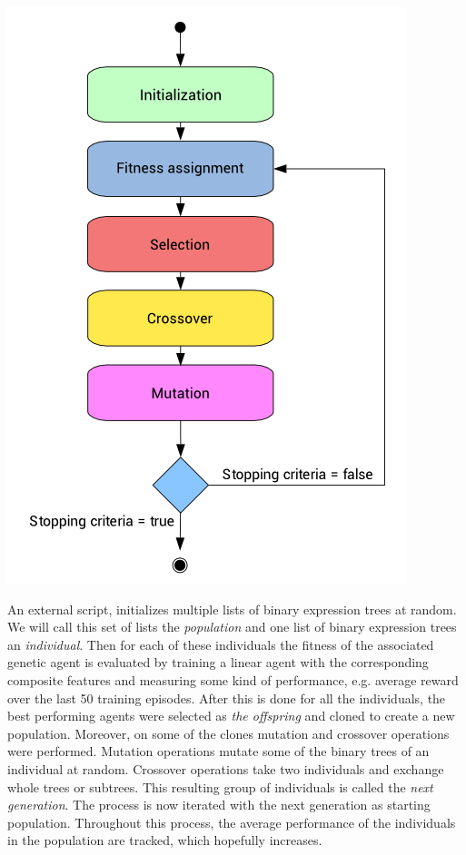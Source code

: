 \begin{center}
\includegraphics[scale=0.5]{graphics/genetic_algorithm.png}
\end{center}

An external script, initializes multiple lists of binary expression trees at random. We will call this set of lists the \emph{population} and one list of binary expression trees an \emph{individual}. Then for each of these individuals the fitness of the associated genetic agent is evaluated by training a linear agent with the corresponding composite features and measuring some kind of performance, e.g. average reward over the last 50 training episodes. After this is done for all the individuals, the best performing agents were selected as \emph{the offspring} and cloned to create a new population. Moreover, on some of the clones mutation and crossover operations were performed. Mutation operations mutate some of the binary trees of an individual at random. Crossover operations take two individuals and exchange whole trees or subtrees. This resulting group of individuals is called the \emph{next generation}. The process is now iterated with the next generation as starting population. Throughout this process, the average performance of the individuals in the population are tracked, which hopefully increases. \\


